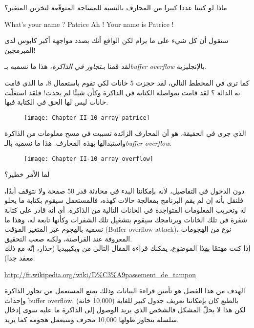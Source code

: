 ماذا لو كتبنا عددا كبيرا من المحارف بالنسبة للمساحة المتوقّعة لتخزين المتغير؟

\begin{Console}
What's your name ? Patrice
Ah ! Your name is Patrice !
\end{Console}

ستقول أن كل شيء على ما يرام لكن الواقع أنك بصدد مواجهة أكبر كابوس لدى المبرمجين!

لقد قمنا بـ\emph{تجاوز في الذاكرة}،
 هذا ما نسميه بـ\emph{\textenglish{buffer overflow}}
بالإنجليزية.

كما ترى في المخطط التالي، لقد حجزت 5 خانات لكي تقوم باستعمال 8، ما الذي قامت به الدالة
؟
 لقد قامت بمواصلة الكتابة في الذاكرة وكأن شيئًا لم يحدث! فلقد استغلّت خانات ليس لها الحق في الكتابة فيها.

\begin{figure}[H]
	\centering
	\texttt{[image: Chapter\_II-10\_array\_patrice]}
\end{figure}

الذي جرى في الحقيقة، هو أن المحارف الزائدة تسببت في مسح معلومات من الذاكرة واستبدالها بهذه المحارف. هذا ما نسميه بالـ\emph{\textenglish{buffer overflow}}.

\begin{figure}[H]
	\centering
	\texttt{[image: Chapter\_II-10\_array\_overflow]}
\end{figure}

\begin{question}
  لما الأمر خطير؟
\end{question}

دون الدخول في التفاصيل، لأنه بإمكاننا البدء في محادثة  قدر 50 صفحة ولا نتوقف أبدًا، فلنقل بأنه إن لم يقم البرنامج بمعالجة حالات كهذه، فالمستعمل سيقوم بكتابة ما يحلو له وتخريب المعلومات المتواجدة في الخانات التالية من الذاكرة. أي أنه قادر على كتابة شفرة في تلك الخانات وبرنامجك سيقوم بتشغيل تلك الشفرات وكأنها تابعة له، وهذا ما نسميه بالهجوم عبر المتغير المؤقت
(\textenglish{Buffer overflow attack})،
نوع من الهجومات المعروفة عند القراصنة، ولكنه صعب التحقيق.\\
إذا كنت مهتمًا بهذا الموضوع، يمكنك قراءة المقال التالي من ويكيبيديا (حذار، إنّه مع ذلك معقد جدا):

\url{http://fr.wikipedia.org/wiki/D%C3%A9passement_de_tampon}

الهدف من هذا الفصل هو تأمين قراءة البيانات وذلك بمنع المستعمل من تجاوز الذاكرة وإحداث
\textenglish{buffer overflow}.
بالطبع كان بإمكاننا تعريف جدول كبير للغاية (10,000 خانة) لكن هذا لا يحلّ المشكل فالشخص الذي يريد الوصول إلى الذاكرة ما عليه سوى إدخال سلسلة يتجاوز طولها 10,000 محرف وسيعمل هجومه كما يريد.


